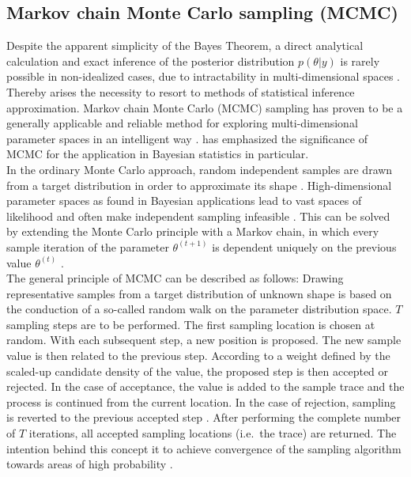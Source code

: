         \subsection{Markov chain Monte Carlo sampling (MCMC)}\label{sec:mcmc}
        Despite the apparent simplicity of the Bayes Theorem, a direct analytical calculation and exact inference of the posterior distribution $p(\theta|y)$ is rarely possible in non-idealized cases, due to intractability in multi-dimensional spaces \citep{hoffman2014no, delaVarga2016}. Thereby arises the necessity to resort to methods of statistical inference approximation. Markov chain Monte Carlo (MCMC) sampling has proven to be a generally applicable and reliable method for exploring multi-dimensional parameter spaces in an intelligent way \citep{hoffman2014no, davidson2015}. \citet{gilks2005markov} has emphasized the significance of MCMC for the application in Bayesian statistics in particular.\\
        In the ordinary Monte Carlo approach, random independent samples are drawn from a target distribution in order to approximate its shape \citep{gilks2005markov, delaVarga2016}. High-dimensional parameter spaces as found in Bayesian applications lead to vast spaces of likelihood and often make independent sampling infeasible \citep{gilks2005markov}. This can be solved by extending the Monte Carlo principle with a Markov chain, in which every sample iteration of the parameter $\theta^{(t+1)}$ is dependent uniquely on the previous value $\theta^{(t)}$ \citep{gilks2005markov, delaVarga2016}.\\
        The general principle of MCMC can be described as follows: 
        Drawing representative samples from a target distribution of unknown shape is based on the conduction of a so-called random walk on the parameter distribution space. $T$ sampling steps are to be performed. The first sampling location is chosen at random. With each subsequent step, a new position is proposed. The new sample value is then related to the previous step. According to a weight defined by the scaled-up candidate density of the value, the proposed step is then accepted or rejected. In the case of acceptance, the value is added to the sample trace and the process is continued from the current location. In the case of rejection, sampling is reverted to the previous accepted step \citep{schaaf2017, delaVarga2016}. After performing the complete number of $T$ iterations, all accepted sampling locations (i.e.\ the trace) are returned. The intention behind this concept it to achieve convergence of the sampling algorithm towards areas of high probability \citep{davidson2015}.\\ 
